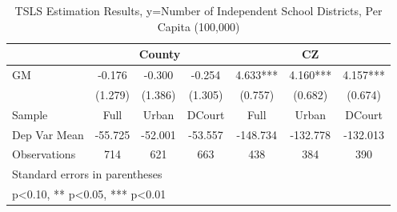 \begin{table}[htbp]\centering
\def\sym#1{\ifmmode^{#1}\else\(^{#1}\)\fi}
\caption{TSLS Estimation Results, y=Number of Independent School Districts, Per Capita (100,000)}
\begin{tabular}{l*{6}{c}}
\toprule
                &\multicolumn{3}{c}{County}            &\multicolumn{3}{c}{CZ}                \\\cmidrule(lr){2-4}\cmidrule(lr){5-7}
\midrule
GM              &   -0.176   &   -0.300   &   -0.254   &    4.633***&    4.160***&    4.157***\\
                &  (1.279)   &  (1.386)   &  (1.305)   &  (0.757)   &  (0.682)   &  (0.674)   \\
\midrule
Sample          &     Full   &    Urban   &   DCourt   &     Full   &    Urban   &   DCourt   \\
Dep Var Mean    &  -55.725   &  -52.001   &  -53.557   & -148.734   & -132.778   & -132.013   \\
Observations    &      714   &      621   &      663   &      438   &      384   &      390   \\
\bottomrule
\multicolumn{7}{l}{\footnotesize Standard errors in parentheses}\\
\multicolumn{7}{l}{\footnotesize * p<0.10, ** p<0.05, *** p<0.01}\\
\end{tabular}
\end{table}
